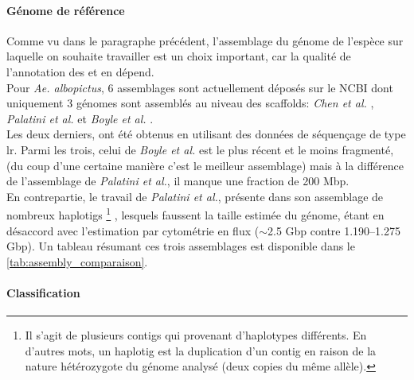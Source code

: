 \documentclass[10pt]{article}
\begin{document}
\bigskip

\paragraph{Génome de référence} Comme vu dans le paragraphe précédent, l'assemblage du génome de l'espèce sur laquelle on souhaite travailler est un choix important, car la qualité de l'annotation des \acrlong{et} en dépend. \\
Pour \textit{Ae. albopictus}, 6 assemblages sont actuellement déposés sur le NCBI \cite{information_national_nodate} dont uniquement 3 génomes sont assemblés au niveau des scaffolds: \textit{Chen et al.} \cite{chen_genome_2015}, \textit{Palatini et al.} \cite{palatini_improved_2020} et \textit{Boyle et al.} \cite{boyle_linkage-based_2021}. \\

Les deux derniers, ont été obtenus en utilisant des données de séquençage de type \acrfull{lr}. Parmi les trois, celui de  \textit{Boyle et al.} est le plus récent et le moins fragmenté, (du coup d'une certaine manière c'est le meilleur assemblage) mais à la différence de l'assemblage de \textit{Palatini et al.}, il manque une fraction de 200 Mbp. \\
En contrepartie, le travail de \textit{Palatini et al.}, présente dans son assemblage de nombreux haplotigs
\footnote{Il s'agit de plusieurs contigs qui provenant d'haplotypes différents. En d'autres mots, un haplotig est la duplication d'un contig en raison de la nature hétérozygote du génome analysé (deux copies du même allèle).}
, lesquels faussent la taille estimée du génome, étant en désaccord avec l'estimation par cytométrie en flux ($\sim$2.5 Gbp contre 1.190–1.275 Gbp). Un tableau résumant ces trois assemblages est disponible dans le \autoref{tab:assembly_comparaison}.

\bigskip

\paragraph{Classification}
\end{document}
